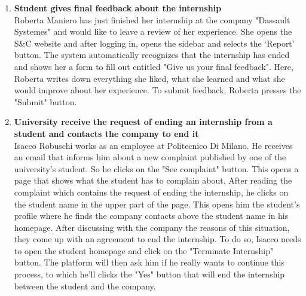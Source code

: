 \begin{enumerate}
      \item \textbf{Student gives final feedback about the internship}\\
      Roberta Maniero has just finished her internship at the company "Dassault Systemes" and would like to leave a review of her experience. She opens the S\&C website and after logging in, opens the sidebar and selects the ‘Report’ button.
      The system automatically recognizes that the internship has ended and shows her a form to fill out entitled "Give us your final feedback". Here, Roberta writes down everything she liked, what she learned and what she would improve about her experience. To submit feedback, Roberta presses the "Submit" button.


      \item \textbf{University receive the request of ending an internship from a student and contacts the company to end it}\\
      Isacco Robuschi works as an employee at Politecnico Di Milano. He receives an email that informs him about a new complaint published by one of the university's student. So he clicks on the "See complaint" button. This opens a page that shows what the student has to complain about. After reading the complaint which contains the request of ending the internship, he clicks on the student name in the upper part of the page. This opens him the student's profile where he finds the company contacts above the student name in his homepage. After discussing with the company the reasons of this situation, they come up with an agreement to end the internship. To do so, Isacco needs to open the student homepage and click on the "Terminate Internship" button. The platform will then ask him if he really wants to continue this process, to which he'll clicks the "Yes" button that will end the internship between the student and the company.      


\end{enumerate}
